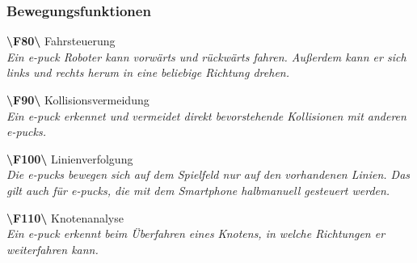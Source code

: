 \documentclass[10pt,a4paper]{article}
\begin{document}
			\subsubsection{Bewegungsfunktionen}
				\begin{list}{}{\leftmargin=1cm}
					\item[\textbf{\textbackslash F80\textbackslash}] Fahrsteuerung
						\\ \textsl{Ein e-puck Roboter kann vorwärts und rückwärts fahren. Außerdem kann er sich links und rechts herum
						in eine beliebige Richtung drehen.}
					\item[\textbf{\textbackslash F90\textbackslash}] Kollisionsvermeidung
						\\ \textsl{Ein e-puck erkennet und vermeidet direkt bevorstehende Kollisionen mit anderen e-pucks.}
					\item[\textbf{\textbackslash F100\textbackslash}] Linienverfolgung
						\\ \textsl{Die e-pucks bewegen sich auf dem Spielfeld nur auf den vorhandenen Linien. Das gilt auch für e-pucks,
						die mit dem Smartphone halbmanuell gesteuert werden.}
					\item[\textbf{\textbackslash F110\textbackslash}] Knotenanalyse
						\\ \textsl{Ein e-puck erkennt beim Überfahren eines Knotens, in welche Richtungen er weiterfahren kann.}
				\end{list}
\end{document}
